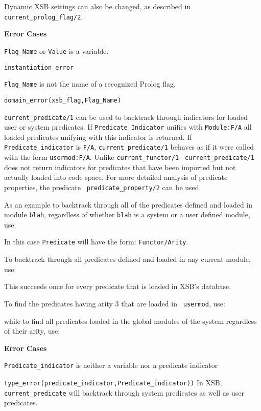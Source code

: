 \begin{description}
Dynamic XSB settings can also be changed, as described in {\tt
  current\_prolog\_flag/2}.

{\bf Error Cases}
\bi
\item 	{\tt Flag\_Name} or {\tt Value} is a variable.
\bi
\item 	{\tt instantiation\_error}
\ei
%
\item 	{\tt Flag\_Name} is not the name of a recognized Prolog flag.
\bi
\item 	{\tt domain\_error(xsb\_flag,Flag\_Name)}
\ei
\ei

%
{\tt current\_predicate/1} can be used to backtrack through indicators
for loaded user or system predicates.  If {\tt Predicate\_Indicator}
unifies with {\tt Module:F/A} all loaded predicates unifying with this
indicator is returned.  If {\tt Predicate\_indicator} is {\tt F/A},
{\tt current\_predicate/1} behaves as if it were called with the form
{\tt usermod:F/A}.  Unlike {\tt current\_functor/1} {\tt
current\_predicate/1} does not return indicators for predicates that
have been imported but not actually loaded into code space.  For more
detailed analysis of predicate properties, the predicate {\tt
predicate\_property/2} can be used.

As an example to backtrack through all of the predicates defined and loaded in
module {\tt blah}, regardless of whether {\tt blah} is a system or a
user defined module, use:


    In this case {\tt Predicate} will have the form: {\tt Functor/Arity}.

    To backtrack through all predicates defined and loaded in any current 
    module, use:


    This succeeds once for every predicate that is loaded in XSB's
    database.

    To find the predicates having arity 3 that are loaded in {\tt
    usermod}, use:


    while to find all predicates loaded in the global modules of the system
    regardless of their arity, use:

%
{\bf Error Cases}
\bi
\item 	{\tt Predicate\_indicator} is neither a variable nor a predicate indicator
\bi
\item 	{\tt type\_error(predicate\_indicator,Predicate\_indicator))}
\ei
\ei
%
\compatability
%
In XSB, {\tt current\_predicate} will backtrack through system
predicates as well as user predicates.



\end{description}
